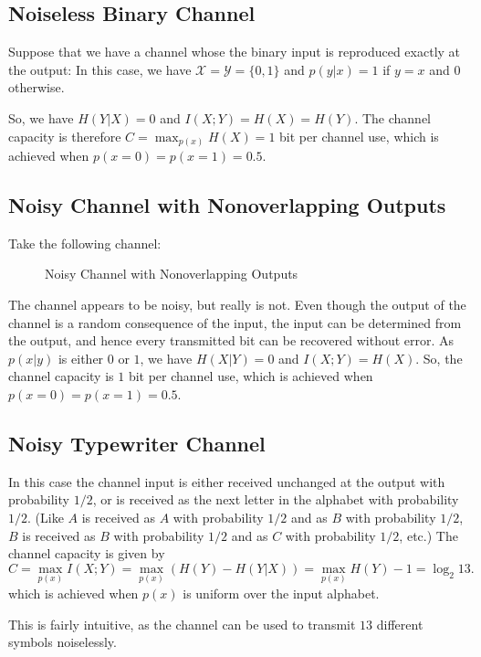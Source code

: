 \documentclass[../main.tex]{subfiles}
\begin{document}
\subsection{Noiseless Binary Channel}
Suppose that we have a channel whose the binary input is reproduced exactly at the output: In this case, we have $\mathcal{X} = \mathcal{Y} = \{0,1\}$ and $p(y|x) = 1$ if $y=x$ and $0$ otherwise.

So, we have $H(Y|X) = 0$ and $I(X;Y) = H(X) = H(Y)$. The channel capacity is therefore $C = \max_{p(x)} H(X) = 1$ bit per channel use, which is achieved when $p(x=0) = p(x=1) = 0.5$.

\subsection{Noisy Channel with Nonoverlapping Outputs}
Take the following channel:
\begin{figure}[ht]
	\centering
	\caption{Noisy Channel with Nonoverlapping Outputs}
	\label{fig:noisy-channel-with-nonoverlapping-outputs}
\end{figure}
The channel appears to be noisy, but really is not. Even though the output of the channel is a random consequence of the input, the input can be determined from the output, and hence every transmitted bit can be recovered without error. As $p(x|y)$ is either $0$ or $1$, we have $H(X|Y) = 0$ and $I(X;Y) = H(X)$. So, the channel capacity is $1$ bit per channel use, which is achieved when $p(x=0) = p(x=1) = 0.5$.

\subsection{Noisy Typewriter Channel}
In this case the channel input is either received unchanged at the output with probability $1/2$, or is received as the next letter in the alphabet with probability $1/2$. (Like $A$ is received as $A$ with probability $1/2$ and as $B$ with probability $1/2$, $B$ is received as $B$ with probability $1/2$ and as $C$ with probability $1/2$, etc.) The channel capacity is given by
\begin{equation}
	C = \max_{p(x)} I(X;Y) = \max_{p(x)} (H(Y) - H(Y|X)) = \max_{p(x)} H(Y) - 1 = \log_2 13.
\end{equation}
which is achieved when $p(x)$ is uniform over the input alphabet.

\begin{remark}
	This is fairly intuitive, as the channel can be used to transmit $13$ different symbols noiselessly.
\end{remark}
\end{document}
